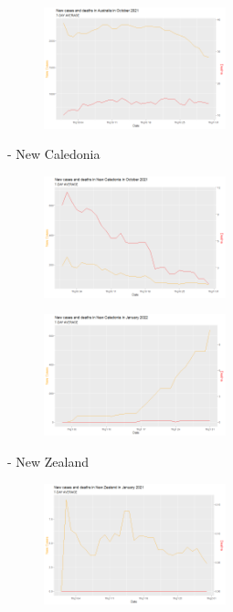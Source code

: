 \documentclass[a4paper]{article}
\theoremstyle{definition}
\begin{document}
\begin{enumerate}[i)]
\begin{enumerate}[1)]
		\begin{figure} [!htp]
  		\centering
  		\includegraphics [width=0.47\textwidth] {Images/aus_cad_2}
		\end{figure}
		\pagebreak
	- New Caledonia\\
		\begin{figure} [!htp]
  		\centering
  		\includegraphics [width=0.47\textwidth] {Images/cal_cad_1}
		\end{figure}
		
		\begin{figure} [!htp]
  		\centering
  		\includegraphics [width=0.47\textwidth] {Images/cal_cad_2}
		\end{figure}
	- New Zealand\\
		\begin{figure} [!htp]
  		\centering
  		\includegraphics [width=0.47\textwidth] {Images/zea_cad_7}
		\end{figure}
		

\end{enumerate}
\end{enumerate}
\end{document}
